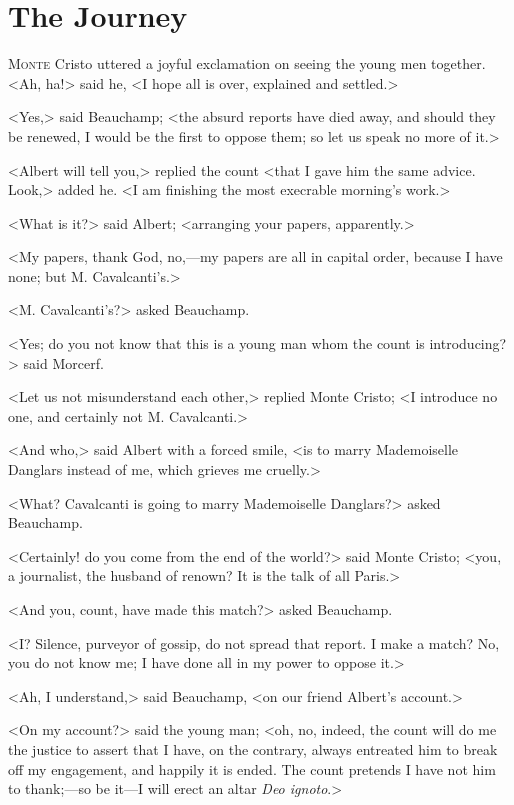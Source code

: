 \chapter{The Journey} 

 \lettrine{M}{onte} Cristo uttered a joyful exclamation on seeing the young men together. <Ah, ha!> said he, <I hope all is over, explained and settled.> 

\zz
 <Yes,> said Beauchamp; <the absurd reports have died away, and should they be renewed, I would be the first to oppose them; so let us speak no more of it.> 

 <Albert will tell you,> replied the count <that I gave him the same advice. Look,> added he. <I am finishing the most execrable morning's work.> 

 <What is it?> said Albert; <arranging your papers, apparently.> 

 <My papers, thank God, no,—my papers are all in capital order, because I have none; but M. Cavalcanti's.> 

 <M. Cavalcanti's?> asked Beauchamp. 

 <Yes; do you not know that this is a young man whom the count is introducing?> said Morcerf. 

 <Let us not misunderstand each other,> replied Monte Cristo; <I introduce no one, and certainly not M. Cavalcanti.> 

 <And who,> said Albert with a forced smile, <is to marry Mademoiselle Danglars instead of me, which grieves me cruelly.> 

 <What? Cavalcanti is going to marry Mademoiselle Danglars?> asked Beauchamp. 

 <Certainly! do you come from the end of the world?> said Monte Cristo; <you, a journalist, the husband of renown? It is the talk of all Paris.> 

 <And you, count, have made this match?> asked Beauchamp. 

 <I? Silence, purveyor of gossip, do not spread that report. I make a match? No, you do not know me; I have done all in my power to oppose it.> 

 <Ah, I understand,> said Beauchamp, <on our friend Albert's account.> 

 <On my account?> said the young man; <oh, no, indeed, the count will do me the justice to assert that I have, on the contrary, always entreated him to break off my engagement, and happily it is ended. The count pretends I have not him to thank;—so be it—I will erect an altar \textit{Deo ignoto}.> 

